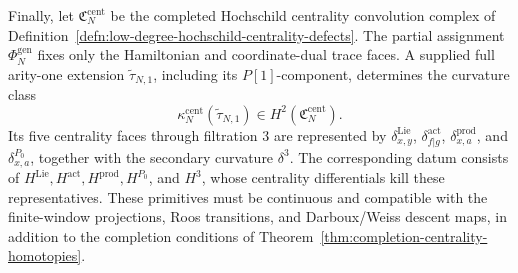 \documentclass[11pt]{memoir}
\begin{document}
\begin{prop}
  Finally, let
  \(\mathfrak C^{\mathrm{cent}}_N\) be the completed Hochschild
  centrality convolution complex of
  Definition~\ref{defn:low-degree-hochschild-centrality-defects}.  The
  partial assignment \(\Phi_N^{\mathrm{gen}}\) fixes only the
  Hamiltonian and coordinate-dual trace faces.  A supplied full
  arity-one extension \(\widetilde\tau_{N,1}\), including its
  \(P[1]\)-component, determines the curvature class
  \[
    \kappa_N^{\mathrm{cent}}(\widetilde\tau_{N,1})
    \in H^2(\mathfrak C^{\mathrm{cent}}_N).
  \]
  Its five centrality faces through filtration \(3\) are represented by
  \(\delta^{\mathrm{Lie}}_{x,y}\),
  \(\delta^{\mathrm{act}}_{f|g}\),
  \(\delta^{\mathrm{prod}}_{x,a}\), and
  \(\delta^{P_0}_{x,a}\), together with the secondary curvature
  \(\delta^3\).  The corresponding datum consists of
  \(H^{\mathrm{Lie}},H^{\mathrm{act}},H^{\mathrm{prod}},H^{P_0}\), and
  \(H^3\), whose centrality differentials kill these representatives.
  These primitives must be continuous and compatible with the
  finite-window projections, Roos transitions, and Darboux/Weiss
  descent maps, in addition to the completion conditions of
  Theorem~\ref{thm:completion-centrality-homotopies}.
\end{prop}
\end{document}
